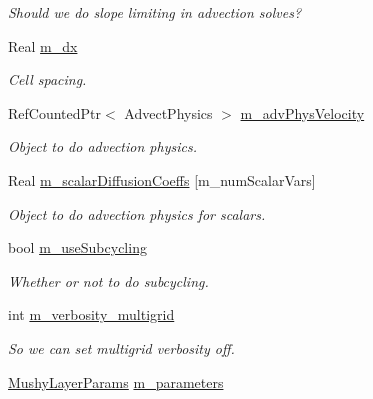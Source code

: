\begin{DoxyCompactItemize}
\begin{DoxyCompactList}\small\item\em Should we do slope limiting in advection solves? \end{DoxyCompactList}\item 
\hypertarget{class_a_m_r_level_mushy_layer_a6e8ce82a43920d2e8bcca5aab6b4ac5e}{Real \hyperlink{class_a_m_r_level_mushy_layer_a6e8ce82a43920d2e8bcca5aab6b4ac5e}{m\-\_\-dx}}\label{class_a_m_r_level_mushy_layer_a6e8ce82a43920d2e8bcca5aab6b4ac5e}

\begin{DoxyCompactList}\small\item\em Cell spacing. \end{DoxyCompactList}\item 
Ref\-Counted\-Ptr$<$ Advect\-Physics $>$ \hyperlink{class_a_m_r_level_mushy_layer_acc7b64a985eeb8434eff80c393733c1f}{m\-\_\-adv\-Phys\-Velocity}
\begin{DoxyCompactList}\small\item\em Object to do advection physics. \end{DoxyCompactList}\item 
Real \hyperlink{class_a_m_r_level_mushy_layer_afb12e6063552f8629a5d81fbac6ac20b}{m\-\_\-scalar\-Diffusion\-Coeffs} \mbox{[}m\-\_\-num\-Scalar\-Vars\mbox{]}
\begin{DoxyCompactList}\small\item\em Object to do advection physics for scalars. \end{DoxyCompactList}\item 
\hypertarget{class_a_m_r_level_mushy_layer_abe297f9aa07e4d85ac2bfdd1efe09781}{bool \hyperlink{class_a_m_r_level_mushy_layer_abe297f9aa07e4d85ac2bfdd1efe09781}{m\-\_\-use\-Subcycling}}\label{class_a_m_r_level_mushy_layer_abe297f9aa07e4d85ac2bfdd1efe09781}

\begin{DoxyCompactList}\small\item\em Whether or not to do subcycling. \end{DoxyCompactList}\item 
\hypertarget{class_a_m_r_level_mushy_layer_ad6dcb2741d855105a79cc6386a921cdc}{int \hyperlink{class_a_m_r_level_mushy_layer_ad6dcb2741d855105a79cc6386a921cdc}{m\-\_\-verbosity\-\_\-multigrid}}\label{class_a_m_r_level_mushy_layer_ad6dcb2741d855105a79cc6386a921cdc}

\begin{DoxyCompactList}\small\item\em So we can set multigrid verbosity off. \end{DoxyCompactList}\item 
\hypertarget{class_a_m_r_level_mushy_layer_abe361484bd04d3be84f4c3a0c96d896d}{\hyperlink{class_mushy_layer_params}{Mushy\-Layer\-Params} \hyperlink{class_a_m_r_level_mushy_layer_abe361484bd04d3be84f4c3a0c96d896d}{m\-\_\-parameters}}\label{class_a_m_r_level_mushy_layer_abe361484bd04d3be84f4c3a0c96d896d}


\end{DoxyCompactItemize}
